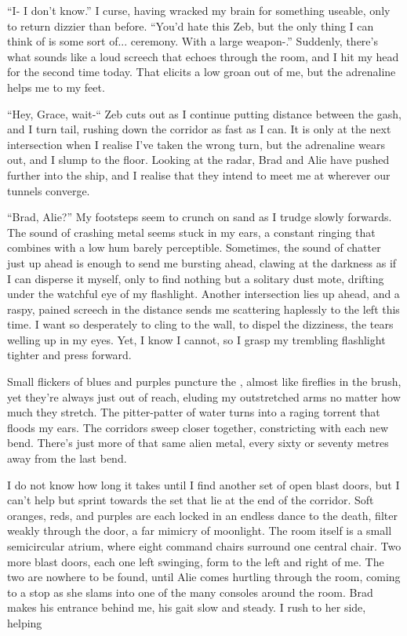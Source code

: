 “I- I don’t know.” I curse, having wracked my brain for something useable, only to return dizzier than before. “You’d hate this Zeb, but the only thing I can think of is some sort of... ceremony. With a large weapon-.” Suddenly, there’s what sounds like a loud screech that echoes through the room, and I hit my head for the second time today. That elicits a low groan out of me, but the adrenaline helps me to my feet. 

“Hey, Grace, wait-“ Zeb cuts out as I continue putting distance between the gash, and I turn tail, rushing down the corridor as fast as I can. It is only at the next intersection when I realise I’ve taken the wrong turn, but the adrenaline wears out, and I slump to the floor. Looking at the radar, Brad and Alie have pushed further into the ship, and I realise that they intend to meet me at wherever our tunnels converge.  

“Brad, Alie?” My footsteps seem to crunch on sand as I trudge slowly forwards. The sound of crashing metal seems stuck in my ears, a constant ringing that combines with a low hum barely perceptible. Sometimes, the sound of chatter just up ahead is enough to send me bursting ahead, clawing at the darkness as if I can disperse it myself, only to find nothing but a solitary dust mote, drifting under the watchful eye of my flashlight. Another intersection lies up ahead, and a raspy, pained screech in the distance sends me scattering haplessly to the left this time. I want so desperately to cling to the wall, to dispel the dizziness, the tears welling up in my eyes. Yet, I know I cannot, so I grasp my trembling flashlight tighter and press forward. 

Small flickers of blues and purples puncture the , almost like fireflies in the brush, yet they’re always just out of reach, eluding my outstretched arms no matter how much they stretch. The pitter-patter of water turns into a raging torrent that floods my ears. The corridors sweep closer together, constricting with each new bend. There’s just more of that same alien metal, every sixty or seventy metres away from the last bend. 

I do not know how long it takes until I find another set of open blast doors, but I can’t help but sprint towards the set that lie at the end of the corridor. Soft oranges, reds, and purples are each locked in an endless dance to the death, filter weakly through the door, a far mimicry of moonlight. The room itself is a small semicircular atrium, where eight command chairs surround one central chair. Two more blast doors, each one left swinging, form to the left and right of me. The two are nowhere to be found, until Alie comes hurtling through the room, coming to a stop as she slams into one of the many consoles around the room. Brad makes his entrance behind me, his gait slow and steady. I rush to her side, helping  

